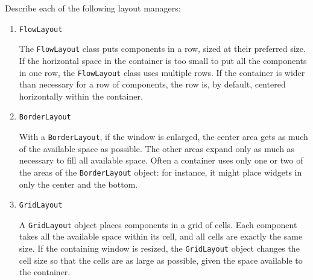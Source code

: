 Describe each of the following layout managers:
\begin{enumerate}

\item \texttt{FlowLayout}
\begin{answer}
The \texttt{FlowLayout} class puts components in a row, sized at their preferred size. If the horizontal space in the container is too small to put all the components in one row, the \texttt{FlowLayout} class uses multiple rows. If the container is wider than necessary for a row of components, the row is, by default, centered horizontally within the container. \end{answer}

\item \texttt{BorderLayout}
\begin{answer}
With a \texttt{BorderLayout}, if the window is enlarged, the center area gets as much of the available space as possible. The other areas expand only as much as necessary to fill all available space. Often a container uses only one or two of the areas of the \texttt{BorderLayout} object: for instance, it might place widgets in only the center and the bottom. \end{answer}

\item \texttt{GridLayout}
\begin{answer}
A \texttt{GridLayout} object places components in a grid of cells. Each component takes all the available space within its cell, and all cells are exactly the same size. If the containing window is resized, the \texttt{GridLayout} object changes the cell size so that the cells are as large as possible, given the space available to the container.\end{answer}
\end{enumerate}


\vspace{24pt}